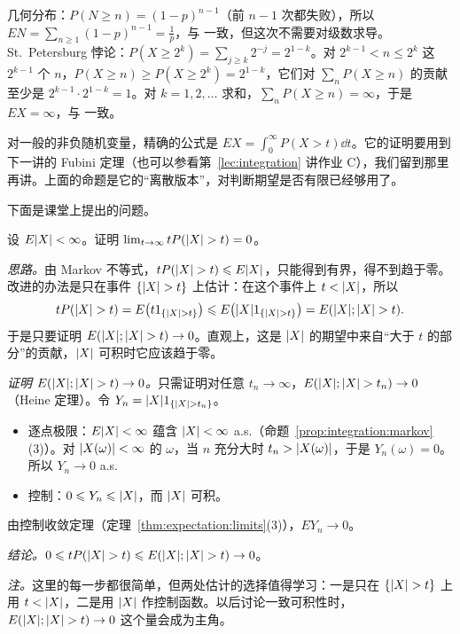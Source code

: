 \begin{example}
几何分布：$P(N\geqslant n)=(1-p)^{n-1}$（前 $n-1$ 次都失败），所以 $EN=\sum_{n\geqslant1}(1-p)^{n-1}=\frac1p$，与 一致，但这次不需要对级数求导。St.\ Petersburg 悖论：$P(X\geqslant2^k)=\sum_{j\geqslant k}2^{-j}=2^{1-k}$。对 $2^{k-1}<n\leqslant2^k$ 这 $2^{k-1}$ 个 $n$，$P(X\geqslant n)\geqslant P(X\geqslant2^k)=2^{1-k}$，它们对 $\sum_nP(X\geqslant n)$ 的贡献至少是 $2^{k-1}\cdot2^{1-k}=1$。对 $k=1,2,\dots$ 求和，$\sum_nP(X\geqslant n)=\infty$，于是 $EX=\infty$，与 一致。
\end{example}

对一般的非负随机变量，精确的公式是 $EX=\int_0^\infty P(X>t)\dd t$。它的证明要用到下一讲的 Fubini 定理（也可以参看第~\ref{lec:integration} 讲作业 C），我们留到那里再讲。上面的命题是它的“离散版本”，对判断期望是否有限已经够用了。

下面是课堂上提出的问题。

\begin{workedexample}\label{we:expectation:tP}
设 $E\lvert X\rvert<\infty$。证明 $\lim_{t\to\infty}tP(\lvert X\rvert>t)=0$。
\end{workedexample}
\begin{solution}
\emph{思路。}由 Markov 不等式，$tP(\lvert X\rvert>t)\leqslant E\lvert X\rvert$，只能得到有界，得不到趋于零。改进的办法是只在事件 $\{\lvert X\rvert>t\}$ 上估计：在这个事件上 $t<\lvert X\rvert$，所以
\[
tP(\lvert X\rvert>t)=E\bigl(t1_{\{\lvert X\rvert>t\}}\bigr)\leqslant E\bigl(\lvert X\rvert1_{\{\lvert X\rvert>t\}}\bigr)=E(\lvert X\rvert;\lvert X\rvert>t).
\]
于是只要证明 $E(\lvert X\rvert;\lvert X\rvert>t)\to0$。直观上，这是 $\lvert X\rvert$ 的期望中来自“大于 $t$ 的部分”的贡献，$\lvert X\rvert$ 可积时它应该趋于零。

\emph{证明 $E(\lvert X\rvert;\lvert X\rvert>t)\to0$。}只需证明对任意 $t_n\to\infty$，$E(\lvert X\rvert;\lvert X\rvert>t_n)\to0$（Heine 定理）。令 $Y_n=\lvert X\rvert1_{\{\lvert X\rvert>t_n\}}$。
\begin{itemize}
\item 逐点极限：$E\lvert X\rvert<\infty$ 蕴含 $\lvert X\rvert<\infty$ a.s.（命题~\ref{prop:integration:markov}(3)）。对 $\lvert X(\omega)\rvert<\infty$ 的 $\omega$，当 $n$ 充分大时 $t_n>\lvert X(\omega)\rvert$，于是 $Y_n(\omega)=0$。所以 $Y_n\to0$ a.s.
\item 控制：$0\leqslant Y_n\leqslant\lvert X\rvert$，而 $\lvert X\rvert$ 可积。
\end{itemize}
由控制收敛定理（定理~\ref{thm:expectation:limits}(3)），$EY_n\to0$。

\emph{结论。}$0\leqslant tP(\lvert X\rvert>t)\leqslant E(\lvert X\rvert;\lvert X\rvert>t)\to0$。

\emph{注。}这里的每一步都很简单，但两处估计的选择值得学习：一是只在 $\{\lvert X\rvert>t\}$ 上用 $t<\lvert X\rvert$，二是用 $\lvert X\rvert$ 作控制函数。以后讨论一致可积性时，$E(\lvert X\rvert;\lvert X\rvert>t)\to0$ 这个量会成为主角。
\end{solution}

